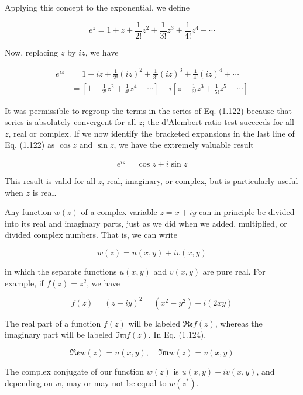 \documentclass[10pt]{article}
\begin{document}
Applying this concept to the exponential, we define


\begin{equation*}
e^{z}=1+z+\frac{1}{2!} z^{2}+\frac{1}{3!} z^{3}+\frac{1}{4!} z^{4}+\cdots \tag{1.121}
\end{equation*}


Now, replacing $z$ by $i z$, we have


\begin{align*}
e^{i z} & =1+i z+\frac{1}{2!}(i z)^{2}+\frac{1}{3!}(i z)^{3}+\frac{1}{4!}(i z)^{4}+\cdots \\
& =\left[1-\frac{1}{2!} z^{2}+\frac{1}{4!} z^{4}-\cdots\right]+i\left[z-\frac{1}{3!} z^{3}+\frac{1}{5!} z^{5}-\cdots\right] \tag{1.122}
\end{align*}


It was permissible to regroup the terms in the series of Eq. (1.122) because that series is absolutely convergent for all $z$; the d'Alembert ratio test succeeds for all $z$, real or complex. If we now identify the bracketed expansions in the last line of Eq. (1.122) as $\cos z$ and $\sin z$, we have the extremely valuable result


\begin{equation*}
e^{i z}=\cos z+i \sin z \tag{1.123}
\end{equation*}


This result is valid for all $z$, real, imaginary, or complex, but is particularly useful when $z$ is real.

Any function $w(z)$ of a complex variable $z=x+i y$ can in principle be divided into its real and imaginary parts, just as we did when we added, multiplied, or divided complex numbers. That is, we can write


\begin{equation*}
w(z)=u(x, y)+i v(x, y) \tag{1.124}
\end{equation*}


in which the separate functions $u(x, y)$ and $v(x, y)$ are pure real. For example, if $f(z)=z^{2}$, we have

$$
f(z)=(z+i y)^{2}=\left(x^{2}-y^{2}\right)+i(2 x y)
$$

The real part of a function $f(z)$ will be labeled $\mathfrak{R e} f(z)$, whereas the imaginary part will be labeled $\mathfrak{I m} f(z)$. In Eq. (1.124),

$$
\mathfrak{R e} w(z)=u(x, y), \quad \Im \mathfrak{m} w(z)=v(x, y)
$$

The complex conjugate of our function $w(z)$ is $u(x, y)-i v(x, y)$, and depending on $w$, may or may not be equal to $w\left(z^{*}\right)$.
\end{document}
